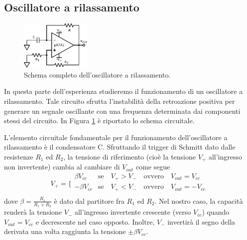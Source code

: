 \subsection{Oscillatore a rilassamento}

\begin{figure}
  \begin{center}
    \includegraphics[width=0.30\textwidth]{../E04/latex/c_rilassamento.pdf}
  \end{center}
  \caption{Schema completo dell'oscillatore a rilassamento.}
  \label{cir4:oscillatore}
\end{figure}

In questa parte dell'esperienza studieremo il funzionamento di un oscillatore a rilassamento. Tale circuito sfrutta l'instabilità della retroazione positiva per generare un segnale oscillante con una frequenza determinata dai componenti stessi del circuito. In Figura \ref{cir4:oscillatore} è riportato lo schema circuitale. 

L'elemento circuitale fondamentale per il funzionamento dell'oscillatore a rilassamento è il condensatore C.  Sfruttando il trigger di Schmitt dato dalle resistenze $R_1$ ed $R_2$, la tensione di riferimento (cioè la tensione $V_+$ all'ingresso non invertente) cambia al cambiare di $V_{out}$ come segue
$$
V_{+} = \bigg \{
\begin{array}{rl}
\beta V_{cc} & \mathrm{se} \quad V_+ > V_- \quad \mathrm{ovvero} \quad V_{out}=V_{cc}\\
-\beta V_{cc} & \mathrm{se} \quad V_+ < V_- \quad \mathrm{ovvero} \quad V_{out}=-V_{cc}\\
\end{array}
$$
dove $\beta=\frac{R_1}{R_1+R_2}$ è dato dal partitore fra $R_1$ ed $R_2$.
Nel nostro caso, la capacità renderà la tensione $V_-$ all'ingresso invertente crescente (verso $V_{cc}$) quando $V_{out}=V_{cc}$ e decrescente nel caso opposto. Inoltre, $V_-$ invertirà il segno della derivata una volta raggiunta la tensione $\pm \beta V_{cc}$.

